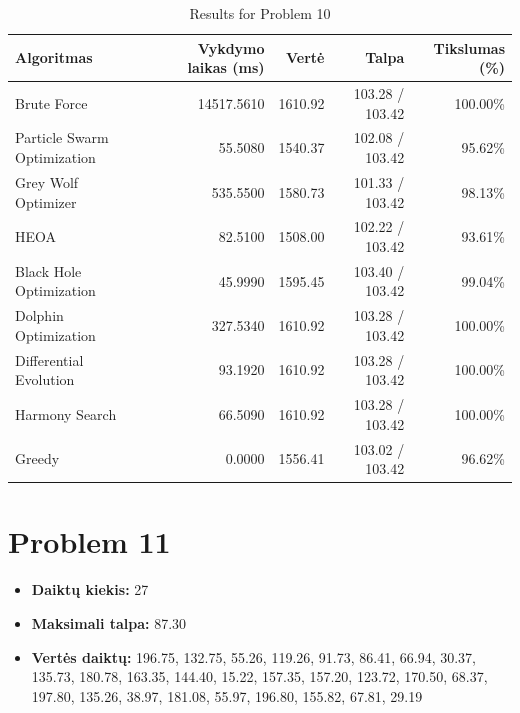 \documentclass[a4paper,11pt]{article}
\begin{document}
\begin{table}[h!]
\centering
\begin{tabular}{lrrrr}
\toprule
\textbf{Algoritmas} & \textbf{Vykdymo laikas (ms)} & \textbf{Vertė} & \textbf{Talpa} & \textbf{Tikslumas (\%)} \\
\midrule
Brute Force & 14517.5610 & 1610.92 & 103.28 / 103.42 & 100.00\% \\
Particle Swarm Optimization & 55.5080 & 1540.37 & 102.08 / 103.42 & 95.62\% \\
Grey Wolf Optimizer & 535.5500 & 1580.73 & 101.33 / 103.42 & 98.13\% \\
HEOA & 82.5100 & 1508.00 & 102.22 / 103.42 & 93.61\% \\
Black Hole Optimization & 45.9990 & 1595.45 & 103.40 / 103.42 & 99.04\% \\
Dolphin Optimization & 327.5340 & 1610.92 & 103.28 / 103.42 & 100.00\% \\
Differential Evolution & 93.1920 & 1610.92 & 103.28 / 103.42 & 100.00\% \\
Harmony Search & 66.5090 & 1610.92 & 103.28 / 103.42 & 100.00\% \\
Greedy & 0.0000 & 1556.41 & 103.02 / 103.42 & 96.62\% \\
\bottomrule
\end{tabular}
\caption{Results for Problem 10}
\end{table}
\clearpage

\section*{Problem 11}
\begin{itemize}
    \item \textbf{Daiktų kiekis:} 27
    \item \textbf{Maksimali talpa:} 87.30
    \item \textbf{Vertės daiktų:} 196.75, 132.75, 55.26, 119.26, 91.73, 86.41, 66.94, 30.37, 135.73, 180.78, 163.35, 144.40, 15.22, 157.35, 157.20, 123.72, 170.50, 68.37, 197.80, 135.26, 38.97, 181.08, 55.97, 196.80, 155.82, 67.81, 29.19
\end{itemize}
\end{document}
